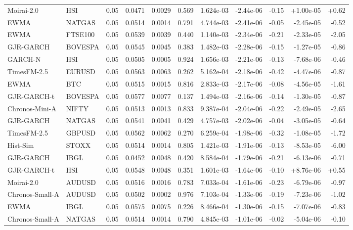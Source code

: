 \begin{tabular}{llrrrrrrrrr}
Moirai-2.0 & HSI & 0.05 & 0.0471 & 0.0029 & 0.569 & 1.624e-03 & -2.44e-06 & -0.15 & +1.00e-05 & +0.62 \\
EWMA & NATGAS & 0.05 & 0.0514 & 0.0014 & 0.791 & 4.744e-03 & -2.41e-06 & -0.05 & -2.45e-05 & -0.52 \\
EWMA & FTSE100 & 0.05 & 0.0539 & 0.0039 & 0.440 & 1.140e-03 & -2.34e-06 & -0.21 & -2.33e-05 & -2.05 \\
GJR-GARCH & BOVESPA & 0.05 & 0.0545 & 0.0045 & 0.383 & 1.482e-03 & -2.28e-06 & -0.15 & -1.27e-05 & -0.86 \\
GARCH-N & HSI & 0.05 & 0.0505 & 0.0005 & 0.924 & 1.656e-03 & -2.21e-06 & -0.13 & -7.68e-06 & -0.46 \\
TimesFM-2.5 & EURUSD & 0.05 & 0.0563 & 0.0063 & 0.262 & 5.162e-04 & -2.18e-06 & -0.42 & -4.47e-06 & -0.87 \\
EWMA & BTC & 0.05 & 0.0515 & 0.0015 & 0.816 & 2.833e-03 & -2.17e-06 & -0.08 & -4.56e-05 & -1.61 \\
GJR-GARCH-t & BOVESPA & 0.05 & 0.0577 & 0.0077 & 0.137 & 1.494e-03 & -2.16e-06 & -0.14 & -1.30e-05 & -0.87 \\
Chronos-Mini-A & NIFTY & 0.05 & 0.0513 & 0.0013 & 0.833 & 9.387e-04 & -2.04e-06 & -0.22 & -2.49e-05 & -2.65 \\
GJR-GARCH & NATGAS & 0.05 & 0.0541 & 0.0041 & 0.429 & 4.757e-03 & -2.02e-06 & -0.04 & -3.05e-05 & -0.64 \\
TimesFM-2.5 & GBPUSD & 0.05 & 0.0562 & 0.0062 & 0.270 & 6.259e-04 & -1.98e-06 & -0.32 & -1.08e-05 & -1.72 \\
Hist-Sim & STOXX & 0.05 & 0.0514 & 0.0014 & 0.805 & 1.421e-03 & -1.91e-06 & -0.13 & -8.53e-05 & -6.00 \\
GJR-GARCH & IBGL & 0.05 & 0.0452 & 0.0048 & 0.420 & 8.584e-04 & -1.79e-06 & -0.21 & -6.13e-06 & -0.71 \\
GJR-GARCH-t & HSI & 0.05 & 0.0548 & 0.0048 & 0.351 & 1.601e-03 & -1.64e-06 & -0.10 & +8.76e-06 & +0.55 \\
Moirai-2.0 & AUDUSD & 0.05 & 0.0516 & 0.0016 & 0.783 & 7.033e-04 & -1.61e-06 & -0.23 & -6.79e-06 & -0.97 \\
Chronos-Small-A & AUDUSD & 0.05 & 0.0502 & 0.0002 & 0.976 & 7.103e-04 & -1.33e-06 & -0.19 & -7.23e-06 & -1.02 \\
EWMA & IBGL & 0.05 & 0.0575 & 0.0075 & 0.226 & 8.466e-04 & -1.30e-06 & -0.15 & -7.07e-06 & -0.83 \\
Chronos-Small-A & NATGAS & 0.05 & 0.0514 & 0.0014 & 0.790 & 4.845e-03 & -1.01e-06 & -0.02 & -5.04e-06 & -0.10 \\

\end{tabular}
